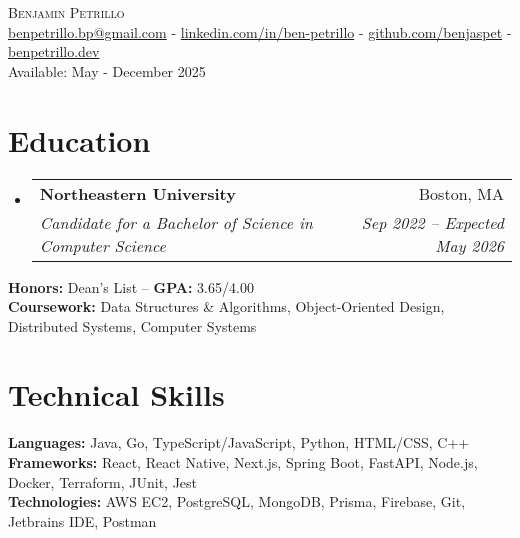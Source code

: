 \documentclass[letterpaper,11pt]{article}
\makeatletter
\newcommand{\resumeSubheading}[4]{
  \vspace{-10pt}\item
    \begin{tabular*}{1.0\textwidth}[t]{l@{\extracolsep{\fill}}r}
      \textbf{#1} & \small #2 \\
      \textit{\small#3} & \textit{\small #4} \\
    \end{tabular*}\vspace{-5pt}
}
\newcommand{\resumeSubHeadingListStart}{\begin{itemize}[leftmargin=0.0in, label={}]}
\newcommand{\resumeSubHeadingListEnd}{\end{itemize}}
\makeatother
\begin{document}
\begin{center}
    {\Huge \scshape Benjamin Petrillo} \\ \vspace{1pt}
    \href{mailto:benpetrillo.bp@gmail.com}{benpetrillo.bp@gmail.com} - \href{https://linkedin.com/in/ben-petrillo}{linkedin.com/in/ben-petrillo} - \href{https://github.com/benjaspet}{github.com/benjaspet} - \href{https://benpetrillo.dev}{benpetrillo.dev} \\ 
    {Available: May - December 2025} 
    \vspace{-12pt}
\end{center}

\section{Education}
    \resumeSubHeadingListStart
        \resumeSubheading
        {Northeastern University}{Boston, MA}
        {Candidate for a Bachelor of Science in Computer Science}
        {Sep 2022 – Expected May 2026}
    \resumeSubHeadingListEnd
    \vspace{-15pt}
    \begin{itemize}[leftmargin=0.0in, label={}]
        \small{\item{
            \textbf{Honors: }{Dean's List} – \textbf{GPA: }{3.65/4.00} \\
            \textbf{Coursework: }{Data Structures \& Algorithms, Object-Oriented Design, Distributed Systems, Computer Systems} \\
        }}
    \end{itemize}
    \vspace{-20pt}

\section{Technical Skills}
 \vspace{-10pt}
 \begin{itemize}[leftmargin=0.0in, label={}]
    \small{\item{
     \textbf{Languages: }{Java, Go, TypeScript/JavaScript, Python, HTML/CSS, C++} \\
     \textbf{Frameworks: }{React, React Native, Next.js, Spring Boot, FastAPI, Node.js, Docker, Terraform, JUnit, Jest} \\
     \textbf{Technologies: }{AWS EC2, PostgreSQL, MongoDB, Prisma, Firebase, Git, Jetbrains IDE, Postman}
    }}
 \end{itemize}
 \vspace{-20pt}
\end{document}
